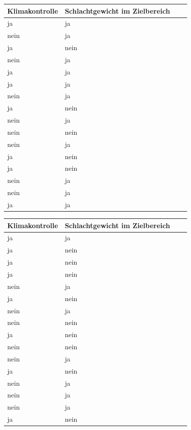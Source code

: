\documentclass[a4paper, 9pt]{scrartcl}\usepackage[]{graphicx}\usepackage[]{xcolor}
\begin{document}
\vspace{1Ex}

\begin{center}
\begin{minipage}[t]{0.45\textwidth}
\small
\begin{center}

\begin{tabular}{p{2.5cm}p{2.5cm}p{2.5cm}p{2.5cm}}
\toprule
Klimakontrolle & Schlachtgewicht im Zielbereich\\
\midrule
ja & ja\\
nein & ja\\
ja & nein\\
nein & ja\\
ja & ja\\
\addlinespace
ja & ja\\
nein & ja\\
ja & nein\\
nein & ja\\
nein & nein\\
\addlinespace
nein & ja\\
ja & nein\\
ja & nein\\
nein & ja\\
nein & ja\\
\addlinespace
ja & ja\\
\bottomrule
\end{tabular}


\end{center}
\end{minipage}
\begin{minipage}[t]{0.45\textwidth}
\small
\begin{center}

\begin{tabular}{p{2.5cm}p{2.5cm}p{2.5cm}p{2.5cm}}
\toprule
Klimakontrolle & Schlachtgewicht im Zielbereich\\
\midrule
ja & ja\\
ja & nein\\
ja & nein\\
ja & nein\\
nein & ja\\
\addlinespace
ja & nein\\
nein & ja\\
nein & nein\\
ja & nein\\
nein & nein\\
\addlinespace
nein & ja\\
ja & nein\\
nein & ja\\
nein & ja\\
nein & ja\\
\addlinespace
ja & nein\\
\bottomrule
\end{tabular}


\end{center}
\end{minipage}
\end{center}
\end{document}
